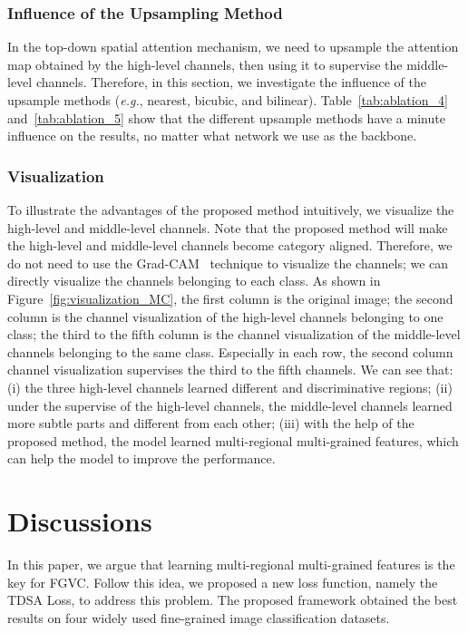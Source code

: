 \documentclass[journal]{IEEEtran}
\begin{document}
\subsubsection{Influence of the Upsampling Method}

In the top-down spatial attention mechanism, we need to upsample the attention map obtained by the high-level channels, then using it to supervise the middle-level channels.  Therefore, in this section, we investigate the influence of the upsample methods (\emph{e.g.}, nearest, bicubic, and bilinear).  Table~\ref{tab:ablation_4} and~\ref{tab:ablation_5} show that the different upsample methods have a minute influence on the results, no matter what network we use as the backbone.





\subsubsection{Visualization}
To illustrate the advantages of the proposed method intuitively, we visualize the high-level and middle-level channels.  Note that the proposed method will make the high-level and middle-level channels become category aligned. Therefore, we do not need to use the Grad-CAM~\cite{selvaraju2017grad} technique to visualize the channels; we can directly visualize the channels belonging to each class. As shown in Figure~\ref{fig:visualization_MC}, the first column is the original image; the second column is the channel visualization of the high-level channels belonging to one class; the third to the fifth column is the channel visualization of the middle-level channels belonging to the same class. Especially in each row,  the second column channel visualization supervises the third to the fifth channels. We can see that: (i) the three high-level channels learned different and discriminative regions; (ii) under the supervise of the high-level channels, the middle-level channels learned more subtle parts and different from each other; (iii) with the help of the proposed method, the model learned multi-regional multi-grained features, which can help the model to improve the performance. 

\section{Discussions}
In this paper, we argue that learning multi-regional multi-grained features is the key for FGVC. Follow this idea,  we proposed a new loss function, namely the TDSA Loss, to address this problem. The proposed framework obtained the best results on four widely used fine-grained image classification datasets.  
\end{document}
